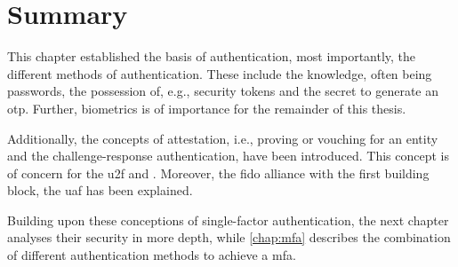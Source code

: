 \newpage
\section{Summary}

This chapter established the basis of authentication, most importantly, the different methods of authentication. These include the knowledge, often being passwords, the possession of, e.g., security tokens and the secret to generate an \gls{otp}. Further, biometrics is of importance for the remainder of this thesis.

Additionally, the concepts of attestation, i.e., proving or vouching for an entity and the challenge-response authentication, have been introduced. This concept is of concern for the \gls{u2f} and \wa. Moreover, the \gls{fido} alliance with the first building block, the \gls{uaf} has been explained.

Building upon these conceptions of single-factor authentication, the next chapter analyses their security in more depth, while \autoref{chap:mfa} describes the combination of different authentication methods to achieve a \gls{mfa}.